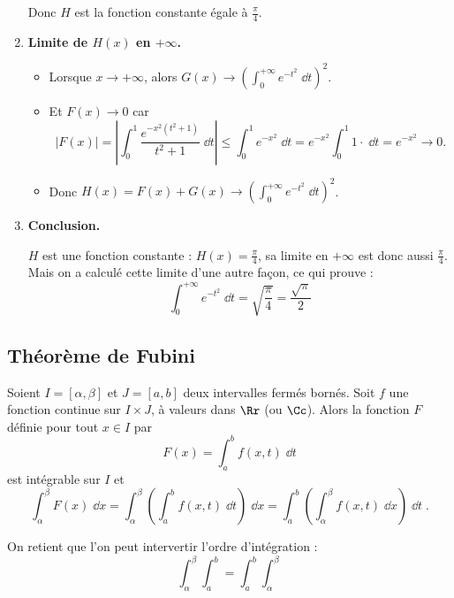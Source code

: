 \documentclass[class=report,crop=false]{standalone}
\begin{document}
\begin{exemple}
\begin{enumerate}
  Donc $H$ est la fonction constante égale à $\frac\pi4$.
  
  \item \textbf{Limite de $H(x)$ en $+\infty$.}  
  \begin{itemize}
    \item Lorsque $x\to+\infty$, alors $G(x) \to \left(\int_0^{+\infty} e^{-t^2}\;\dd t\right)^2$.
    
    \item Et $F(x) \to 0$ car 
    $$\big| F(x) \big|  = 
    \left|\int_0^1 \frac{e^{-x^2(t^2+1)}}{t^2+1}\;\dd t\right|
    \le \int_0^1 e^{-x^2} \;\dd t
    =  e^{-x^2} \int_0^1 1 \cdot \;\dd t 
    = e^{-x^2} \to 0.$$
    
    \item Donc $H(x) = F(x) + G(x) \to  \left(\int_0^{+\infty} e^{-t^2}\;\dd t\right)^2$.
  \end{itemize}
  
  \item \textbf{Conclusion.}
   
   $H$ est une fonction constante : $H(x) = \frac\pi4$, sa limite en $+\infty$ est donc aussi 
   $\frac\pi4$. Mais on a calculé cette limite d'une autre façon, ce qui prouve :
   $$\int_0^{+\infty} e^{-t^2}\;\dd t = \sqrt{\frac{\pi}{4}} = \frac{\sqrt \pi}{2}$$
   
\end{enumerate}
\end{exemple}



\subsection{Théorème de Fubini}


\begin{theoreme}
\label{th:fubini}
Soient $I=[\alpha,\beta]$ et $J=[a,b]$ deux intervalles fermés bornés.
Soit $f$ une fonction continue sur $I\times J$,
à valeurs dans $\Rr$ (ou $\Cc$). Alors la fonction $F$ définie pour
tout $x\in I$ par
$$F(x) = \int_a^b f(x,t)\;\dd t$$ 
est intégrable sur $I$ et
$$\int_\alpha^\beta F(x)\;\dd x =
\int_\alpha^\beta\left(\int_a^b
  f(x,t)\;\dd t\right)\;\dd x = \int_a^b\left(\int_\alpha^\beta
  f(x,t)\;\dd x\right)\;\dd t\;.$$
\end{theoreme}
On retient que l'on peut intervertir l'ordre d'intégration :
$$\int_\alpha^\beta\int_a^b=\int_a^b\int_\alpha^\beta$$
\end{document}
